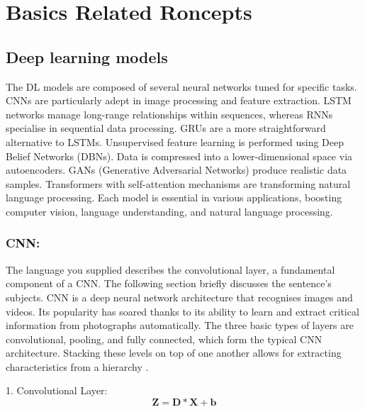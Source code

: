 
\chapter{Basics Related Roncepts} %

\label{c3} %

\section{Deep learning models}
The DL models are composed of several neural networks tuned for specific tasks. CNNs are particularly adept in image processing and feature extraction. LSTM networks manage long-range relationships within sequences, whereas RNNs specialise in sequential data processing. GRUs are a more straightforward alternative to LSTMs. Unsupervised feature learning is performed using Deep Belief Networks (DBNs). Data is compressed into a lower-dimensional space via autoencoders. GANs (Generative Adversarial Networks) produce realistic data samples. Transformers with self-attention mechanisms are transforming natural language processing. Each model is essential in various applications, boosting computer vision, language understanding, and natural language processing.

\subsection{CNN:} The language you supplied describes the convolutional layer, a fundamental component of a CNN. The following section briefly discusses the sentence's subjects. CNN is a deep neural network architecture that recognises images\cite{hao2018optimized,chauhan2018convolutional} and videos\cite{fan2016video,he2021automatic,qi2018cnn}. Its popularity has soared thanks to its ability to learn and extract critical information from photographs automatically. The three basic types of layers are convolutional, pooling, and fully connected, which form the typical CNN architecture. Stacking these levels on top of one another allows for extracting characteristics from a hierarchy \cite{torres2021deep}.

1. Convolutional Layer:
\begin{equation}
\mathbf{Z} = \mathbf{D} * \mathbf{X} + \mathbf{b}
\end{equation}


